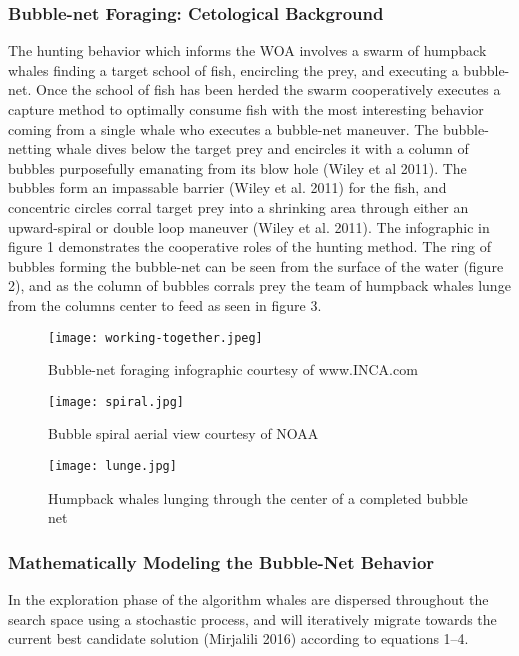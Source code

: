 \documentclass[11pt]{article}
\begin{document}
\subsubsection*{Bubble-net Foraging: Cetological Background}
The hunting behavior which informs the WOA involves a swarm of humpback whales finding a target school of fish, encircling the prey, and executing a bubble-net.
Once the school of fish has been herded the swarm cooperatively executes a capture method to optimally consume fish with the most interesting behavior coming from a single whale who executes a bubble-net maneuver.
The bubble-netting whale dives below the target prey and encircles it with a column of bubbles purposefully emanating from its blow hole (Wiley et al 2011).
The bubbles form an impassable barrier (Wiley et al. 2011) for the fish, and concentric circles corral target prey into a shrinking area through either an upward-spiral or double loop maneuver (Wiley et al. 2011).
The infographic in figure 1 demonstrates the cooperative roles of the hunting method.
The ring of bubbles forming the bubble-net can be seen from the surface of the water (figure 2), and as the column of bubbles corrals prey the team of humpback whales lunge from the columns center to feed as seen in figure 3.

\begin{figure}[h]
	\caption{Bubble-net foraging infographic courtesy of www.INCA.com}
	\texttt{[image: working-together.jpeg]}
\end{figure}

\begin{minipage}{0.45\textwidth}
	\begin{figure}[H]
		\centering
		\caption{Bubble spiral aerial view courtesy of NOAA}
		\texttt{[image: spiral.jpg]}
	\end{figure}
\end{minipage}
\begin{minipage}{0.45\textwidth}
	\begin{figure}[H]
		\centering
		\caption{Humpback whales lunging through the center of a completed bubble net}
		\texttt{[image: lunge.jpg]}
	\end{figure}
\end{minipage}


\subsubsection*{Mathematically Modeling the Bubble-Net Behavior}
In the exploration phase of the algorithm whales are dispersed throughout the search space using a stochastic process, and will iteratively migrate towards the current best candidate solution (Mirjalili 2016) according to equations 1--4.
\end{document}
